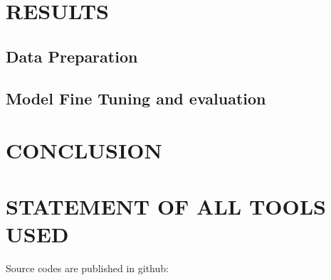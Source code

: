 \documentclass{article}
\begin{document}
\section{RESULTS}
\label{sec:results}

\subsection{Data Preparation}
\label{ssec:data}


  \subsection{Model Fine Tuning and evaluation}
  \label{ssec:model}

  
\section{CONCLUSION}
\label{sec:conclusion}


\section{STATEMENT OF ALL TOOLS USED}
\label{sec:statementofalltoolsused}


Source codes are published in github: 





\vfill\pagebreak



\end{document}
